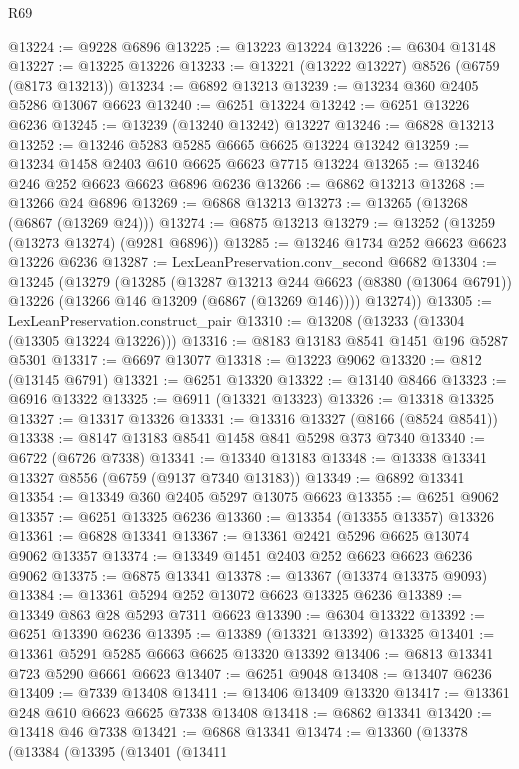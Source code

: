 \begin{lexlean}{R69}
\begin{coremodule}
{@13224 := @9228 @6896
@13225 := @13223 @13224
@13226 := @6304 @13148
@13227 := @13225 @13226
@13233 := @13221 (@13222 @13227) @8526 (@6759 (@8173 @13213))
@13234 := @6892 @13213
@13239 := @13234 @360 @2405 @5286 @13067 @6623
@13240 := @6251 @13224
@13242 := @6251 @13226 @6236
@13245 := @13239 (@13240 @13242) @13227
@13246 := @6828 @13213
@13252 := @13246 @5283 @5285 @6665 @6625 @13224 @13242
@13259 := @13234 @1458 @2403 @610 @6625 @6623 @7715 @13224
@13265 := @13246 @246 @252 @6623 @6623 @6896 @6236
@13266 := @6862 @13213
@13268 := @13266 @24 @6896
@13269 := @6868 @13213
@13273 := @13265 (@13268 (@6867 (@13269 @24)))
@13274 := @6875 @13213
@13279 := @13252 (@13259 (@13273 @13274) (@9281 @6896))
@13285 := @13246 @1734 @252 @6623 @6623 @13226 @6236
@13287 := LexLeanPreservation.conv_second @6682
@13304 := @13245
    (@13279
      (@13285
        (@13287
          @13213
          @244
          @6623
          (@8380 (@13064 @6791))
          @13226
          (@13266 @146 @13209 (@6867 (@13269 @146))))
        @13274))
@13305 := LexLeanPreservation.construct_pair
@13310 := @13208 (@13233 (@13304 (@13305 @13224 @13226)))
@13316 := @8183 @13183 @8541 @1451 @196 @5287 @5301
@13317 := @6697 @13077
@13318 := @13223 @9062
@13320 := @812 (@13145 @6791)
@13321 := @6251 @13320
@13322 := @13140 @8466
@13323 := @6916 @13322
@13325 := @6911 (@13321 @13323)
@13326 := @13318 @13325
@13327 := @13317 @13326
@13331 := @13316 @13327 (@8166 (@8524 @8541))
@13338 := @8147 @13183 @8541 @1458 @841 @5298 @373 @7340
@13340 := @6722 (@6726 @7338)
@13341 := @13340 @13183
@13348 := @13338 @13341 @13327 @8556 (@6759 (@9137 @7340 @13183))
@13349 := @6892 @13341
@13354 := @13349 @360 @2405 @5297 @13075 @6623
@13355 := @6251 @9062
@13357 := @6251 @13325 @6236
@13360 := @13354 (@13355 @13357) @13326
@13361 := @6828 @13341
@13367 := @13361 @2421 @5296 @6625 @13074 @9062 @13357
@13374 := @13349 @1451 @2403 @252 @6623 @6623 @6236 @9062
@13375 := @6875 @13341
@13378 := @13367 (@13374 @13375 @9093)
@13384 := @13361 @5294 @252 @13072 @6623 @13325 @6236
@13389 := @13349 @863 @28 @5293 @7311 @6623
@13390 := @6304 @13322
@13392 := @6251 @13390 @6236
@13395 := @13389 (@13321 @13392) @13325
@13401 := @13361 @5291 @5285 @6663 @6625 @13320 @13392
@13406 := @6813 @13341 @723 @5290 @6661 @6623
@13407 := @6251 @9048
@13408 := @13407 @6236
@13409 := @7339 @13408
@13411 := @13406 @13409 @13320
@13417 := @13361 @248 @610 @6623 @6625 @7338 @13408
@13418 := @6862 @13341
@13420 := @13418 @46 @7338
@13421 := @6868 @13341
@13474 := @13360
    (@13378
      (@13384
        (@13395
          (@13401
            (@13411
}
\end{coremodule}
\end{lexlean}
